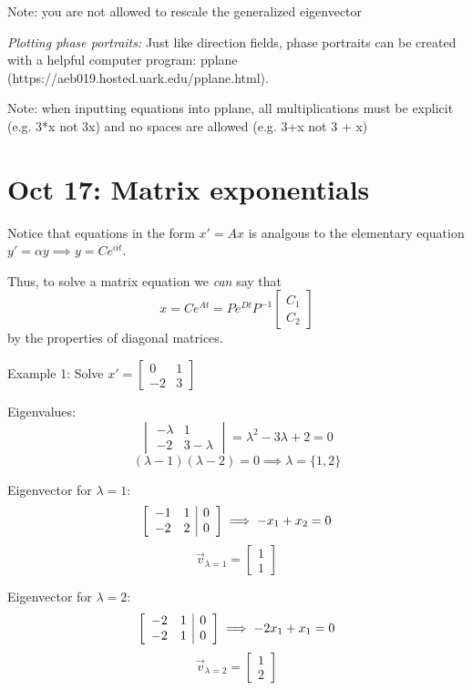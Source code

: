 \documentclass[12pt]{article}
\begin{document}
Note: you are not allowed to rescale the generalized eigenvector

\emph{Plotting phase portraits:} Just like direction fields, phase portraits can be created with a helpful computer program: pplane (https://aeb019.hosted.uark.edu/pplane.html).

Note: when inputting equations into pplane, all multiplications must be explicit (e.g. 3*x not 3x) and no spaces are allowed (e.g. 3+x not 3 + x)

\section{Oct 17: Matrix exponentials}
Notice that equations in the form $x' = Ax$ is analgous to the elementary equation $y' = \alpha y \implies y = Ce^{\alpha t}$. 

Thus, to solve a matrix equation we \emph{can} say that 
\[x = Ce^{At} = Pe^{Dt}P^{-1} \begin{bmatrix}
    C_1\\
    C_2
\end{bmatrix}\]
by the properties of diagonal matrices. 

Example 1: Solve $x' = \begin{bmatrix}
    0 & 1\\
    -2 & 3
\end{bmatrix}$

Eigenvalues:
\[\begin{vmatrix}
    -\lambda & 1\\
    -2 & 3 - \lambda
\end{vmatrix} = \lambda^2 - 3\lambda + 2 = 0\]
\[(\lambda - 1)(\lambda - 2) = 0 \implies \lambda = \{1, 2\}\]

Eigenvector for $\lambda = 1$:
\[\left[\begin{array}{c c |c}
    -1 & 1 & 0\\
    -2 & 2 & 0
\end{array}\right] \implies -x_1 + x_2 = 0\]
\[\vec{v}_{\lambda = 1} = \begin{bmatrix}
    1\\
    1
\end{bmatrix}\]

Eigenvector for $\lambda = 2$:
\[\left[\begin{array}{c c |c}
    -2 & 1 & 0\\
    -2 & 1 & 0
\end{array}\right] \implies -2x_1 + x_1 = 0\]
\[\vec{v}_{\lambda = 2} = \begin{bmatrix}
    1\\
    2
\end{bmatrix}\]
\end{document}
